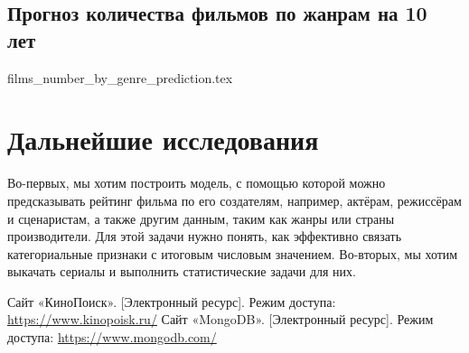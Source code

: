 \documentclass[conference]{IEEEtran}
\begin{document}
\subsection{Прогноз количества фильмов по жанрам на 10 лет}

{films_number_by_genre_prediction.tex}

\section{Дальнейшие исследования}

Во-первых, мы хотим построить модель, с помощью которой можно предсказывать рейтинг фильма по его создателям, например, актёрам, режиссёрам и сценаристам, а также другим данным, таким как жанры или страны производители. Для этой задачи нужно понять, как эффективно связать категориальные признаки с итоговым числовым значением. Во-вторых, мы хотим выкачать сериалы и выполнить статистические задачи для них.

\begin{thebibliography}{00}
 Сайт «КиноПоиск». [Электронный ресурс]. Режим доступа: \url{https://www.kinopoisk.ru/}
 Сайт «MongoDB». [Электронный ресурс]. Режим доступа: \url{https://www.mongodb.com/}

\end{thebibliography}
\end{document}
